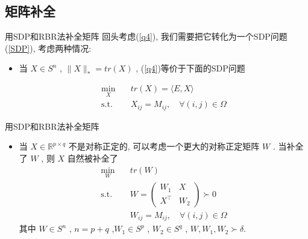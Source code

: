 \documentclass[slidestop, compress, mathserif, UTF8]{beamer}
\numberwithin{equation}{section}                                        %
\begin{document}
		\subsection{矩阵补全}
			\begin{frame}[t]{用SDP和RBR法补全矩阵}
				回头考虑(\ref{q4}), 我们需要把它转化为一个SDP问题(\ref{SDP}), 考虑两种情况:
				
				\begin{itemize}
					\item 当 $X \in S^n$ , $\lVert{X}\rVert_* = tr(X)$ , (\ref{q4})等价于下面的SDP问题

					\begin{equation}
						\begin{split}\label{RBR}
							\min_X \quad
								& tr(X) = \langle{E, X}\rangle\\
							\text{s.t.} \quad
								& X_{ij} = M_{ij}, \quad \forall(i, j) \in \Omega
						\end{split}
					\end{equation}
				\end{itemize}
			\end{frame}
			\begin{frame}[t]{用SDP和RBR法补全矩阵}
				\begin{itemize}
					\item 当 $X \in \mathbb{R}^{p \times q}$ 不是对称正定的, 可以考虑一个更大的对称正定矩阵 $W$ . 当补全了 $W$ , 则 $X$ 自然被补全了
					\begin{equation}
						\begin{split}\label{BigRBR}
							\min_W \quad
								& tr(W)\\
							\text{s.t.} \quad
								& W = \begin{pmatrix}
											W_1 & X \\
											X^\top & W_2
										\end{pmatrix} \succ 0\\
								& W_{ij} = M_{ij}, \quad \forall(i, j) \in \Omega
						\end{split}
					\end{equation}
					\small{其中 $W \in S^{n}$ , $n = p + q$ ,$W_1 \in S^p$ , $W_2 \in  S^q$ , $W, W_1, W_2 \succ \delta$.}\normalsize
				\end{itemize}
			\end{frame}
\end{document}
